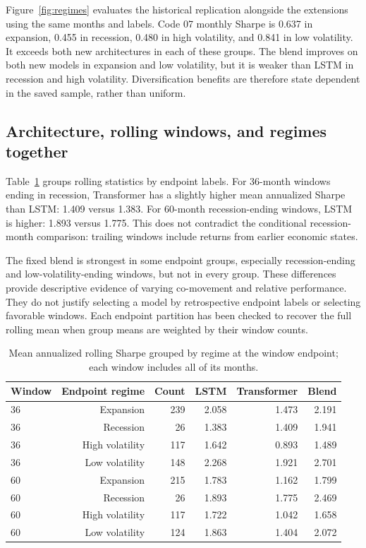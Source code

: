 \documentclass[11pt]{article}
\begin{document}
Figure~\ref{fig:regimes} evaluates the historical replication alongside the extensions using the same months and labels. Code 07 monthly Sharpe is 0.637 in expansion, 0.455 in recession, 0.480 in high volatility, and 0.841 in low volatility. It exceeds both new architectures in each of these groups. The blend improves on both new models in expansion and low volatility, but it is weaker than LSTM in recession and high volatility. Diversification benefits are therefore state dependent in the saved sample, rather than uniform.

\clearpage\subsection{Architecture, rolling windows, and regimes together}
Table~\ref{tab:combined} groups rolling statistics by endpoint labels. For 36-month windows ending in recession, Transformer has a slightly higher mean annualized Sharpe than LSTM: 1.409 versus 1.383. For 60-month recession-ending windows, LSTM is higher: 1.893 versus 1.775. This does not contradict the conditional recession-month comparison: trailing windows include returns from earlier economic states.

The fixed blend is strongest in some endpoint groups, especially recession-ending and low-volatility-ending windows, but not in every group. These differences provide descriptive evidence of varying co-movement and relative performance. They do not justify selecting a model by retrospective endpoint labels or selecting favorable windows. Each endpoint partition has been checked to recover the full rolling mean when group means are weighted by their window counts.
\begin{table}[htbp]\centering\small
\caption{Mean annualized rolling Sharpe grouped by regime at the window endpoint; each window includes all of its months.}\label{tab:combined}
\begin{tabular}{lrrrrr}
\toprule
Window & Endpoint regime & Count & LSTM & Transformer & Blend \\
\midrule
36 & Expansion & 239 & 2.058 & 1.473 & 2.191 \\
36 & Recession & 26 & 1.383 & 1.409 & 1.941 \\
36 & High volatility & 117 & 1.642 & 0.893 & 1.489 \\
36 & Low volatility & 148 & 2.268 & 1.921 & 2.701 \\
60 & Expansion & 215 & 1.783 & 1.162 & 1.799 \\
60 & Recession & 26 & 1.893 & 1.775 & 2.469 \\
60 & High volatility & 117 & 1.722 & 1.042 & 1.658 \\
60 & Low volatility & 124 & 1.863 & 1.404 & 2.072 \\
\bottomrule\end{tabular}\end{table}
\end{document}
